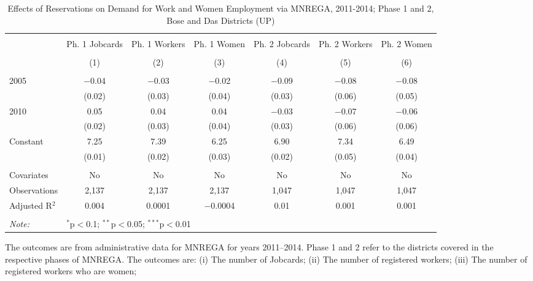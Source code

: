 \begin{sidewaystable}[!htbp]
\centering
\begin{threeparttable}

  \caption{Effects of Reservations on Demand for Work and Women Employment via MNREGA, 2011-2014;
          Phase 1 and 2, Bose and Das Districts (UP)} 
  \label{mnrega_main_up_bd} 
\scriptsize 
\begin{tabular}{@{\extracolsep{0pt}}lcccccc} 
\\[-1.8ex]\hline 
\hline \\[-1.8ex] 
 & Ph. 1 Jobcards & Ph. 1 Workers & Ph. 1 Women & Ph. 2 Jobcards & Ph. 2 Workers & Ph. 2 Women \\ 
\\[-1.8ex] & (1) & (2) & (3) & (4) & (5) & (6)\\ 
\hline \\[-1.8ex] 
 2005 & $-$0.04 & $-$0.03 & $-$0.02 & $-$0.09 & $-$0.08 & $-$0.08 \\ 
  & (0.02) & (0.03) & (0.04) & (0.03) & (0.06) & (0.05) \\ 
  2010 & 0.05 & 0.04 & 0.04 & $-$0.03 & $-$0.07 & $-$0.06 \\ 
  & (0.02) & (0.03) & (0.04) & (0.03) & (0.06) & (0.06) \\ 
  Constant & 7.25 & 7.39 & 6.25 & 6.90 & 7.34 & 6.49 \\ 
  & (0.01) & (0.02) & (0.03) & (0.02) & (0.05) & (0.04) \\ 
 \hline \\[-1.8ex] 
Covariates & No & No & No & No & No & No \\ 
Observations & 2,137 & 2,137 & 2,137 & 1,047 & 1,047 & 1,047 \\ 
Adjusted R$^{2}$ & 0.004 & 0.0001 & $-$0.0004 & 0.01 & 0.001 & 0.001 \\ 
\hline 
\hline \\[-1.8ex] 
\textit{Note:}  & \multicolumn{6}{l}{$^{*}$p$<$0.1; $^{**}$p$<$0.05; $^{***}$p$<$0.01} \\ 
\end{tabular} 
\begin{tablenotes}[flushleft]
\setlength{\itemindent}{0em}
\scriptsize
\item The outcomes are from administrative data for MNREGA for years 2011--2014. 
                     Phase 1 and 2 refer to the districts covered in the respective phases of MNREGA. The outcomes are: 
                     (i) The number of Jobcards; 
                     (ii) The number of registered workers;
                     (iii) The number of registered workers who are women;
\end{tablenotes}
\end{threeparttable}
\end{sidewaystable}
